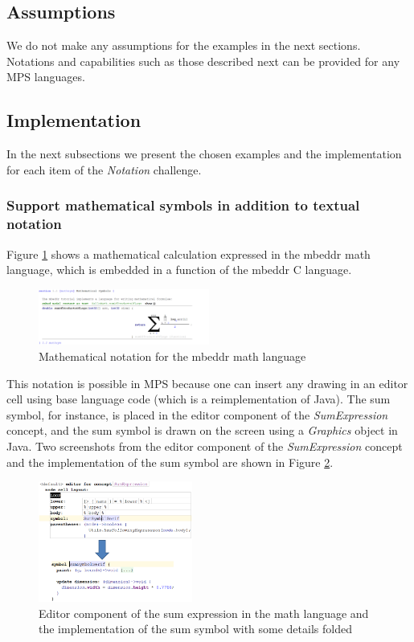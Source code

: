 \documentclass[preprint,numbers,10pt]{sigplanconf}
\begin{document}
\subsection{Assumptions}
We do not make any assumptions for the examples in the next sections. Notations and capabilities such as those
described next can be provided for any MPS languages.

\subsection{Implementation}
In the next subsections we present the chosen examples and the implementation for each
item of the \emph{Notation} challenge.

\subsubsection{Support mathematical symbols in addition to textual notation}
Figure \ref{fig:mathnotation} shows a mathematical calculation expressed in the mbeddr math language, which is embedded in a function of the mbeddr C language.
\begin{figure}[H]
	\centering
	\includegraphics[width=0.50\textwidth]{screens/MathematicalNotation.png}
	\caption{Mathematical notation for the mbeddr math language}
	\label{fig:mathnotation}
\end{figure}

This notation is possible in MPS because one can insert any drawing in an editor cell using base language code (which is a reimplementation of Java).
The sum symbol, for instance, is placed in the editor component of the \emph{SumExpression} concept,
and the sum symbol is drawn on the screen using a \emph{Graphics} object in Java. Two screenshots from
the editor component of the \emph{SumExpression} concept and the implementation of the sum symbol
are shown in Figure \ref{fig:MathSymbolImpl}.

\begin{figure}[H]
	\centering
	\includegraphics[width=0.45\textwidth]{screens/MathSymbolImpl.png}
	\caption{Editor component of the sum expression in the math language and the implementation
of the sum symbol with some details folded}
	\label{fig:MathSymbolImpl}
\end{figure}
\end{document}

